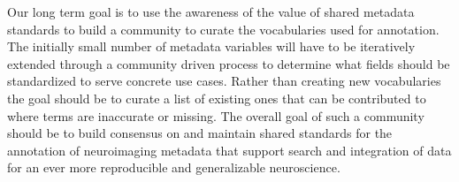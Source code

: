 \documentclass[../main.tex]{subfiles}
\begin{document}
Our long term goal is to use the awareness of the value of shared metadata standards to build a community to curate the vocabularies used for annotation. The initially small number of metadata variables will have to be iteratively extended through a community driven process to determine what fields should be standardized to serve concrete use cases. Rather than creating new vocabularies the goal should be to curate a list of existing ones that can be contributed to where terms are inaccurate or missing. The overall goal of such a community should be to build consensus on and maintain shared standards for the annotation of neuroimaging metadata that support search and integration of data for an ever more reproducible and generalizable neuroscience.
\end{document}
